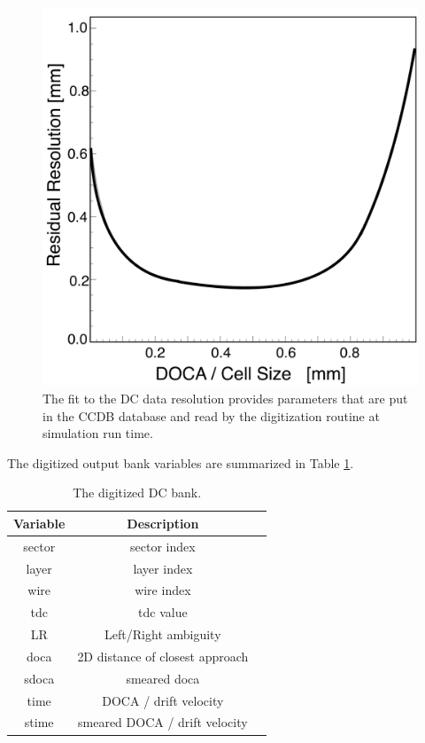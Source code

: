 \begin{figure}
	\centering
	\includegraphics[width=0.99\columnwidth,keepaspectratio]{img/dcResolution.png}
	\caption{The fit to the DC data resolution provides parameters that are put in the CCDB database and read by the digitization routine at simulation run time.}
	\label{fig:dcResolution}
\end{figure}

The digitized output bank variables are summarized in Table \ref{tab:dcBank}.

\begin{table}[h]
	\begin{center}
		\begin{tabular}{| c | c | c |}
			\hline \hline
			Variable   & Description \\
			\hline
               sector  &                    sector index   \\
                layer  &                     layer index   \\
                 wire  &                      wire index   \\
                  tdc  &                       tdc value   \\
                   LR  &            Left/Right ambiguity   \\
                 doca  & 2D distance of closest approach   \\
                sdoca  &                    smeared doca   \\
                 time  &           DOCA / drift velocity   \\
                stime  &   smeared DOCA / drift velocity   \\
			\hline \hline
		\end{tabular}
	\end{center}
	\caption{The digitized DC bank.}\label{tab:dcBank}
\end{table}


